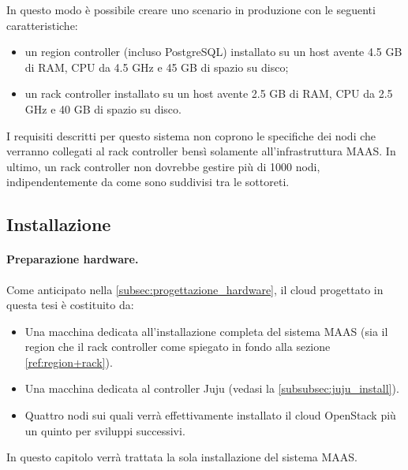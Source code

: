 
\noindent 
In questo modo è possibile creare uno scenario in produzione con le seguenti caratteristiche:

\begin{itemize}
    \item un region controller (incluso PostgreSQL) installato su un host avente 4.5 GB di RAM, CPU da 4.5 GHz e 45 GB di spazio su disco;

    \item un rack controller installato su un host avente 2.5 GB di RAM, CPU da 2.5 GHz e 40 GB di spazio su disco.
\end{itemize}

\noindent
I requisiti descritti per questo sistema non coprono le specifiche dei nodi che verranno collegati al rack controller bensì solamente all'infrastruttura MAAS.
% 
In ultimo, un rack controller non dovrebbe gestire più di 1000 nodi, indipendentemente da come sono suddivisi tra le sottoreti. 



\subsection{Installazione}\label{subsubsec:maas_install}
\paragraph{Preparazione hardware.}
Come anticipato nella \cref{subsec:progettazione_hardware}, il cloud progettato in questa tesi è costituito da:
\begin{itemize}
    \item Una macchina dedicata all'installazione completa del sistema MAAS (sia il region che il rack controller come spiegato in fondo alla sezione \ref{ref:region+rack}).

    \item Una macchina dedicata al controller Juju (vedasi la \cref{subsubsec:juju_install}).
    
    \item Quattro nodi sui quali verrà effettivamente installato il cloud OpenStack più un quinto per sviluppi successivi.
\end{itemize}
% 
In questo capitolo verrà trattata la sola installazione del sistema MAAS.

